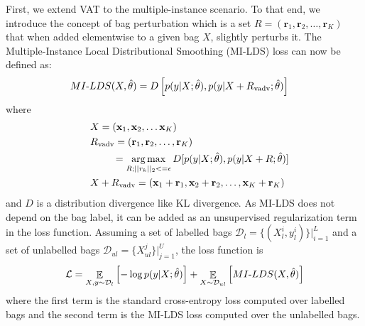 \documentclass[journal,twoside,web]{ieeecolor}
\DeclareMathOperator*{\argmax}{arg\,max}
\DeclareMathOperator*{\milds}{\mathnormal{MI}\text{-}\mathnormal{LDS}}
\DeclareMathOperator*{\E}{\mathbb{E}}
\begin{document}
First, we extend VAT to the multiple-instance scenario.
To that end, we introduce the concept of bag perturbation 
which is a set $R = (\mathbf{r}_1, \mathbf{r}_2, \dots, \mathbf{r}_K)$
that when added elementwise to a given bag $X$, slightly perturbs it.
The Multiple-Instance Local Distributional Smoothing (MI-LDS) loss can now be defined as:
\begin{align}
	\milds(X, \hat{\theta}) &= D\left[p(y|X;\hat{\theta}), p(y|X+R\textsubscript{vadv};\hat{\theta})\right]
	\label{eq:chap8:lds_loss}
\end{align}
where 
\begin{equation*}
  \quad
\begin{split}
  &X = (\mathbf{x}_1, \mathbf{x}_2, \dots \mathbf{x}_K) \\
    &R\textsubscript{vadv} = \left(\mathbf{r}_1, \mathbf{r}_2, \dots,
        \mathbf{r}_K\right) \\
  &\qquad\;= \argmax_{R; ||r_k||_2 <= \epsilon} D[p(y|X; \hat{\theta}), p(y|X+R; \hat{\theta})]\\
               &X+R\textsubscript{vadv} = \left(\mathbf{x}_1 + \mathbf{r}_1, \mathbf{x}_2 + \mathbf{r}_2, \dots, \mathbf{x}_K + \mathbf{r}_K\right)
\end{split}
\end{equation*}
and $D$ is a distribution divergence like KL divergence.
As MI-LDS does not depend on the bag label, it can be added as an unsupervised regularization
term in the loss function. 
Assuming a set of labelled bags $\mathcal{D}_l = \{(X_l^i, y_l^i)\} |_{i=1}^L$ and a
set of unlabelled bags $\mathcal{D}_{ul} = \{X_{ul}^j\} |_{j=1}^U$, the loss
function is
\begin{equation}
  \mathcal{L} = \E_{X,y \sim \mathcal{D}_l} \left[ -\log p(y|X; \hat{\theta})
\right]
+ \E_{X \sim \mathcal{D}_{ul}} \left[\milds(X, \hat{\theta})\right]
\label{eq:chap8:cost_function}
\end{equation}
where the first term is the standard cross-entropy loss computed over labelled
bags and the second term is the MI-LDS loss computed over the unlabelled bags.
\end{document}
